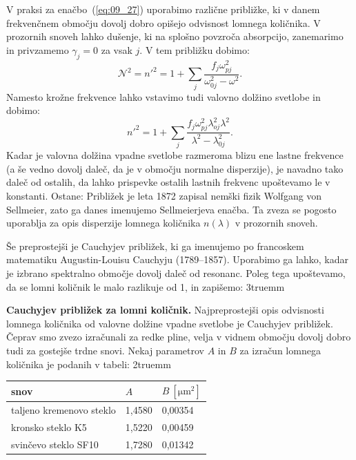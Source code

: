 V praksi za enačbo~(\ref{eq:09_27}) uporabimo različne približke, ki v danem frekvenčnem
območju dovolj dobro opišejo odvisnost lomnega količnika. V prozornih snoveh lahko 
dušenje, ki na splošno povzroča absorpcijo, zanemarimo in privzamemo $\gamma_j = 0$ za 
vsak $j$. V tem približku dobimo:
\begin{equation}
\mathcal{N}^2 = n'^2 = 1+ \sum_j \frac{f_j \omega_{pj}^2}{\omega_{0j}^2 - \omega^2}.
\label{eq:09_28}
\end{equation}
Namesto krožne frekvence lahko vstavimo tudi valovno dolžino svetlobe in dobimo:
\begin{equation}
n'^2 = 1 + \sum_j \frac{f_j \omega_{pj}^2\lambda_{oj}^2\lambda^2}{\lambda^2 - \lambda_{0j}^2}.
\label{eq:09_29}
\end{equation}
Kadar je valovna dolžina vpadne svetlobe razmeroma blizu ene lastne frekvence (a še vedno 
dovolj daleč, da je v območju normalne disperzije), je navadno tako daleč
od ostalih, da lahko prispevke ostalih lastnih frekvenc upoštevamo le v konstanti. Ostane:
Približek je leta 1872 zapisal nemški fizik Wolfgang von Sellmeier, zato ga danes
imenujemo Sellmeierjeva enačba. Ta zveza se pogosto uporablja za opis disperzije 
lomnega količnika $n(\lambda)$ v prozornih snoveh.

Še preprostejši je Cauchyjev približek, ki ga imenujemo po francoskem matematiku
Augustin-Louisu Cauchyju (1789--1857).
Uporabimo ga lahko, kadar je izbrano spektralno
območje dovolj daleč od resonanc. Poleg tega upoštevamo, da se lomni količnik le malo 
razlikuje od 1, in 
zapišemo:
\vglue3truemm
\begin{example}{\bf Cauchyjev približek za lomni količnik.}
Najpreprostejši opis odvisnosti lomnega količnika od valovne dolžine vpadne svetlobe
je Cauchyjev približek. Čeprav smo zvezo izračunali za redke pline, velja v vidnem
območju dovolj dobro tudi
za gostejše trdne snovi. Nekaj parametrov $A$ in $B$ za izračun lomnega količnika
je podanih v tabeli:
\vglue2truemm
\begin{center}
\begin{tabular}{|l|l|l|}
\hline
snov& $A$ & $B~[\si{\micro\metre}^2]$\\ \hline 
taljeno kremenovo steklo & 1,4580 & 0,00354\\ \hline
kronsko steklo K5 & 1,5220 & 0,00459\\ \hline
svinčevo steklo SF10 & 1,7280 & 0,01342\\ \hline
\end{tabular}
\end{center}
\end{example}

